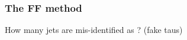 \begin{frame}
\frametitle{The FF method}

\manip How many jets are mis-identified as \tauh? (fake taus)

\end{frame}

%
%
%
